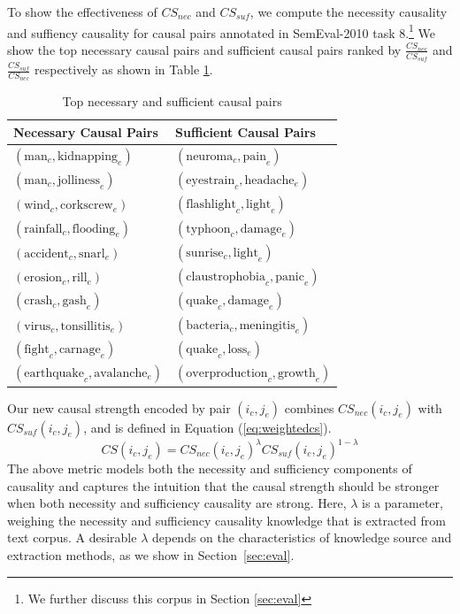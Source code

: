 \documentclass[letterpaper]{article}
\newcommand{\tabref}[1]{Table \ref{#1}}
\newcommand{\secref}[1]{Section \ref{#1}}
\newcommand{\eqnref}[1]{Equation (\ref{#1})}
\begin{document}
To show the effectiveness of $CS_{nec}$ and $CS_{suf}$,
we compute the necessity causality and suffiency causality
for causal pairs annotated in SemEval-2010 task 8.\footnote{We further
discuss this corpus in \secref{sec:eval}}
We show the top necessary causal pairs and sufficient causal
pairs ranked by $\frac{CS_{nec}}{CS_{suf}}$ and $\frac{CS_{suf}}{CS_{nec}}$
respectively as shown in \tabref{tab:necsuf}.
\begin{table}[th]
\caption{Top necessary and sufficient causal pairs}
\label{tab:necsuf}
\begin{tabular}{l|l}
Necessary Causal Pairs & Sufficient Causal Pairs \\
\hline \hline
$(\text{man}_c, \text{kidnapping}_e)$ & $(\text{neuroma}_c, \text{pain}_e)$ \\
$(\text{man}_c, \text{jolliness}_e)$ & $(\text{eyestrain}_c, \text{headache}_e)$ \\
$(\text{wind}_c, \text{corkscrew}_e)$ & $(\text{flashlight}_c, \text{light}_e)$ \\
$(\text{rainfall}_c, \text{flooding}_e)$ & $(\text{typhoon}_c, \text{damage}_e)$ \\
$(\text{accident}_c, \text{snarl}_e)$ & $(\text{sunrise}_c, \text{light}_e)$ \\
$(\text{erosion}_c, \text{rill}_e)$ & $(\text{claustrophobia}_c, \text{panic}_e)$ \\
$(\text{crash}_c, \text{gash}_e)$ & $(\text{quake}_c, \text{damage}_e)$\\
$(\text{virus}_c, \text{tonsillitis}_e)$ & $(\text{bacteria}_c, \text{meningitis}_e)$  \\
$(\text{fight}_c, \text{carnage}_e)$ & $(\text{quake}_c, \text{loss}_e)$ \\
$(\text{earthquake}_c, \text{avalanche}_e)$ & $(\text{overproduction}_c, \text{growth}_e)$ \\
\hline
\end{tabular}
\end{table}

Our new causal strength encoded by pair $(i_c,j_e)$ combines
$CS_{nec}(i_c,j_e)$ with $CS_{suf}(i_c,j_e)$,
and is defined in \eqnref{eq:weightedcs}.
\begin{equation}
CS(i_c,j_e) = CS_{nec}(i_c,j_e)^{\lambda} CS_{suf}(i_c,j_e)^{1-\lambda}
\label{eq:weightedcs}
\end{equation}
The above metric models both the necessity and sufficiency components
of causality and captures the intuition that
the causal strength should be stronger when both necessity and sufficiency
causality are strong.
Here, $\lambda$ is a parameter, weighing the necessity and sufficiency
causality knowledge that is extracted from text corpus.
A desirable $\lambda$ depends on the characteristics of knowledge
source and extraction methods, as we show in Section~\ref{sec:eval}.
\end{document}
